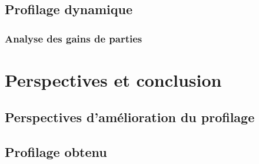 \documentclass{report}
\begin{document}
\section{Profilage dynamique}
\subsection{Analyse des gains de parties}


\chapter{Perspectives et conclusion}
\section{Perspectives d'amélioration du profilage}
\section{Profilage obtenu}



\nocite{*}


		

		
		
		
\end{document}
